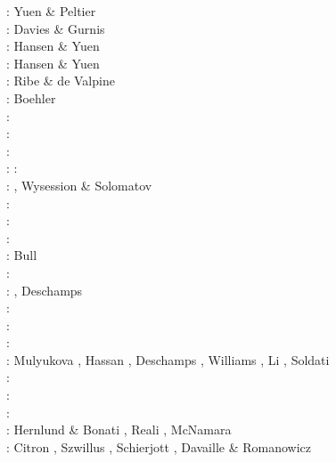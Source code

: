 \begin{scriptsize}
\nineteeneighty: Yuen \& Peltier \cite{yupe80}\\
\nineteeneightysix: Davies \& Gurnis \cite{dagu86}\\
\nineteeneightyeight: Hansen \& Yuen \cite{hayu88}\\
\nineteeneightynine: Hansen \& Yuen \cite{hayu89}\\
\nineteenninetyfour: Ribe \& de Valpine \cite{ride94}\\
\nineteenninetysix: Boehler \cite{boeh96}\\
\nineteenninetyseven: \cite{kell97}\\
\nineteenninetyeight: \cite{tack98b}\\
\twothousandone: \cite{soga01}\\
\twothousandtwo: \cite{somo02}\cite{tagh02}
\twothousandfour: \cite{mczh04}\cite{nata04}\\
\twothousandfive: \cite{mczh05a}\cite{nata05}\cite{nata05b}, Wysession \& Solomatov \cite{wyso05}\\
\twothousandsix: \cite{nata06}\\
\twothousandseven: \cite{heta07}\cite{moyu07}\cite{pelt07}\cite{hibl07}\cite{yumc07}\\
\twothousandeight: \cite{gamc08}\cite{nata08}\cite{stho08}\\
\twothousandnine:  Bull \etal \cite{bumr09}\\
\twothousandten: \cite{stto10}\cite{mcgr10}\cite{nata10}\cite{vady10}\\
\twothousandeleven: \cite{bowg11}\cite{talz11}\cite{vayj11}, Deschamps \etal \cite{dekt11}\\
\twothousandtwelve: \cite{stto12}\cite{dagd12}\cite{dect12}\\
\twothousandthirteen: \cite{limc13}\cite{bogs13a}\cite{bogs13b}\\
\twothousandfourteen: \cite{budt14}\cite{lidt14}\cite{tovd14}\\
\twothousandfifteen: Mulyukova \etal \cite{musd15}, Hassan \etal \cite{hafg15}, Deschamps \etal \cite{delt15},
                     Williams \etal \cite{wilm15}, Li \etal \cite{lidt15}, Soldati \etal \cite{sobd15}\\
\twothousandsixteen: \cite{dost16}\cite{tosa16}\\
\twothousandseventeen: \cite{hish17}\cite{lizh17}\\
\twothousandeighteen: \cite{daga18}\cite{lizo18}\cite{hect18}\cite{dert18}\\
\twothousandnineteen: Hernlund \& Bonati \cite{hebo19}, Reali \etal \cite{rejv19}, McNamara \cite{mcna19}\\
\twothousandtwenty: Citron \etal \cite{cilw20}, Szwillus \etal \cite{szes20}, Schierjott \etal \cite{scrt20},
                    Davaille \& Romanowicz \cite{daro20}
\end{scriptsize}

